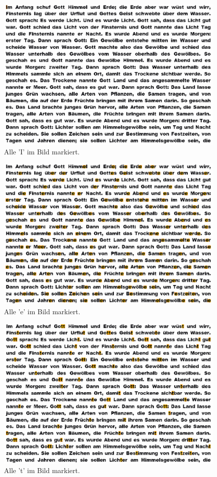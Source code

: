 \documentclass[german,notitlepage,smartquotes]{hgbreport}
\begin{document}
\begin{figure}[h]
\centering
\includegraphics[width=.7\textwidth]{test-02-I}
\caption{Alle 'I' im Bild markiert.}
\label{fig:test-02}
\end{figure}

\begin{figure}[h]
\centering
\includegraphics[width=.7\textwidth]{test-03-e}
\caption{Alle 'e' im Bild markiert.}
\label{fig:test-03}
\end{figure}

\begin{figure}[h]
\centering
\includegraphics[width=.7\textwidth]{test-04-t}
\caption{Alle 't' im Bild markiert.}
\label{fig:test-04}
\end{figure}
\end{document}
